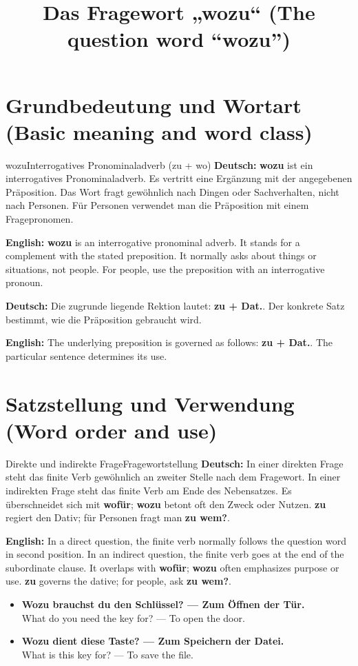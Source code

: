 \documentclass[a4paper,11pt]{article}
\title{Das Fragewort „wozu“ (The question word “wozu”)}
\date{}
\newcommand{\GermanText}[1]{\textbf{Deutsch: }#1\par}
\newcommand{\EnglishText}[1]{{\small\color{SoftGray}\textbf{English: }#1\par}}
\newcommand{\ExampleItem}[2]{\item \textbf{#1}\\{\small\color{SoftGray}#2}}
\begin{document}
\maketitle
\tableofcontents
\newpage
\section{Grundbedeutung und Wortart (Basic meaning and word class)}
\begin{grammarentry}{wozu}{Interrogatives Pronominaladverb (zu + wo)}
\GermanText{\textbf{wozu} ist ein interrogatives Pronominaladverb. Es vertritt eine Ergänzung mit der angegebenen Präposition. Das Wort fragt gewöhnlich nach Dingen oder Sachverhalten, nicht nach Personen. Für Personen verwendet man die Präposition mit einem Fragepronomen.}
\EnglishText{\textbf{wozu} is an interrogative pronominal adverb. It stands for a complement with the stated preposition. It normally asks about things or situations, not people. For people, use the preposition with an interrogative pronoun.}
\GermanText{Die zugrunde liegende Rektion lautet: \textbf{zu + Dat.}. Der konkrete Satz bestimmt, wie die Präposition gebraucht wird.}
\EnglishText{The underlying preposition is governed as follows: \textbf{zu + Dat.}. The particular sentence determines its use.}
\end{grammarentry}
\section{Satzstellung und Verwendung (Word order and use)}
\begin{grammarentry}{Direkte und indirekte Frage}{Fragewortstellung}
\GermanText{In einer direkten Frage steht das finite Verb gewöhnlich an zweiter Stelle nach dem Fragewort. In einer indirekten Frage steht das finite Verb am Ende des Nebensatzes. Es überschneidet sich mit \textbf{wofür}; \textbf{wozu} betont oft den Zweck oder Nutzen. \textbf{zu} regiert den Dativ; für Personen fragt man \textbf{zu wem?}.}
\EnglishText{In a direct question, the finite verb normally follows the question word in second position. In an indirect question, the finite verb goes at the end of the subordinate clause. It overlaps with \textbf{wofür}; \textbf{wozu} often emphasizes purpose or use. \textbf{zu} governs the dative; for people, ask \textbf{zu wem?}.}
\end{grammarentry}
\begin{exbox}\begin{itemize}
\ExampleItem{Wozu brauchst du den Schlüssel? — Zum Öffnen der Tür.}{What do you need the key for? — To open the door.}
\ExampleItem{Wozu dient diese Taste? — Zum Speichern der Datei.}{What is this key for? — To save the file.}
\end{itemize}\end{exbox}
\end{document}

